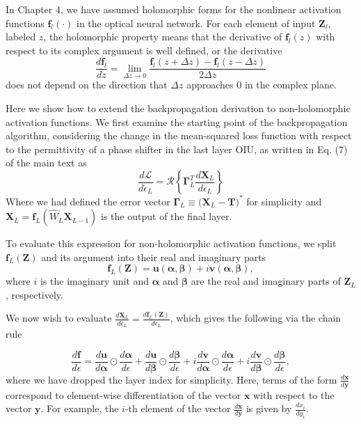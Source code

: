 
In Chapter 4, we have assumed holomorphic forms for the nonlinear activation functions $\mathbf{f}_l(\cdot)$ in the optical neural network.  For each element of input $\mathbf{Z}_l$, labeled $z$, the holomorphic property means that the derivative of $\mathbf{f}_l(z)$ with respect to its complex argument is well defined, or the derivative 
\begin{equation}
\frac{d\mathbf{f}_l}{dz} = \lim_{\Delta z \to 0} \frac{\mathbf{f}_l(z+\Delta z) - \mathbf{f}_l(z-\Delta z)}{2 \Delta z}
\end{equation}
does not depend on the direction that $\Delta z$ approaches $0$ in the complex plane.  

Here we show how to extend the backpropagation derivation to non-holomorphic activation functions.  We first examine the starting point of the backpropagation algorithm, considering the change in the mean-squared loss function with respect to the permittivity of a phase shifter in the last layer OIU, as written in Eq. (7) of the main text as 
\begin{equation}
\frac{d\mathcal{L}}{d\epsilon_L} = \mathcal{R}\left\{\boldsymbol{\Gamma}_L^T \frac{d\mathbf{X}_L}{d\epsilon_L} \right\}
\label{eq:beginning}
\end{equation}
Where we had defined the error vector $\boldsymbol{\Gamma}_L \equiv \big(\mathbf{X}_L - \mathbf{T} \big)^*$ for simplicity and $\mathbf{X}_L = \mathbf{f}_L(\hat{W}_L \mathbf{X}_{L-1})$ is the output of the final layer.

To evaluate this expression for non-holomorphic activation functions, we split $\mathbf{f}_L(\mathbf{Z})$ and its argument into their real and imaginary parts
\begin{equation}
\mathbf{f}_L(\mathbf{Z}) = \mathbf{u}(\boldsymbol{\alpha}, \boldsymbol{\beta}) + i \mathbf{v}(\boldsymbol{\alpha}, \boldsymbol{\beta}),
\end{equation}
where $i$ is the imaginary unit and $\boldsymbol{\alpha}$ and $\boldsymbol{\beta}$ are the real and imaginary parts of $\mathbf{Z}_L$, respectively.

We now wish to evaluate $\frac{d\mathbf{X}_L}{d\epsilon_L} = \frac{d\mathbf{f}_L(\mathbf{Z})}{d\epsilon_L}$, which gives the following via the chain rule

\begin{equation}
\frac{d\mathbf{f}}{d\epsilon} = \frac{d\mathbf{u}}{d\boldsymbol{\alpha}} \odot \frac{d\boldsymbol{\alpha}}{d\epsilon} + \frac{d\mathbf{u}}{d\boldsymbol{\beta}} \odot \frac{d\boldsymbol{\beta}}{d\epsilon} + i\frac{d\mathbf{v}}{d\boldsymbol{\alpha}} \odot \frac{d\boldsymbol{\alpha}}{d\epsilon} + i\frac{d\mathbf{v}}{d\boldsymbol{\beta}} \odot \frac{d\boldsymbol{\beta}}{d\epsilon},
\end{equation}
where we have dropped the layer index for simplicity.  Here, terms of the form $\frac{d\mathbf{x}}{d\mathbf{y}}$ correspond to element-wise differentiation of the vector $\mathbf{x}$ with respect to the vector $\mathbf{y}$.  For example, the $i$-th element of the vector $\frac{d\mathbf{x}}{d\mathbf{y}}$ is given by $\frac{dx_i}{dy_i}$.

